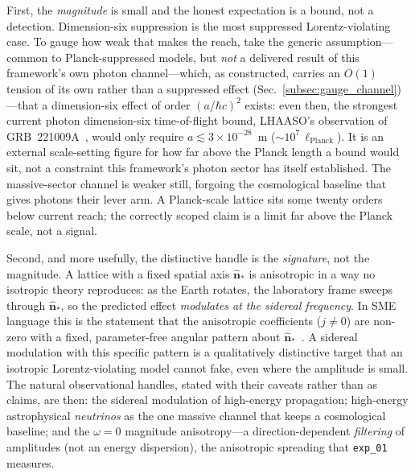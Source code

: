 First, the \emph{magnitude} is small and the honest expectation is a bound, not a
detection. Dimension-six suppression is the most suppressed Lorentz-violating case. To
gauge how weak that makes the reach, take the generic assumption---common to
Planck-suppressed models, but \emph{not} a delivered result of this framework's own
photon channel---which, as constructed, carries an $O(1)$ tension of its own rather than
a suppressed effect (Sec.~\ref{subsec:gauge_channel})---that a
dimension-six effect of order $(a/\hbar c)^2$ exists: even then, the strongest current
photon dimension-six time-of-flight bound, LHAASO's observation of
GRB~221009A~\cite{lhaaso2024grb}, would only require $a \lesssim 3\times10^{-28}$~m
($\sim\!10^{7}\,\ell_\text{Planck}$). It is an external scale-setting figure for how far
above the Planck length a bound would sit, not a constraint this framework's photon
sector has itself established. The massive-sector channel is weaker still, forgoing the
cosmological baseline that gives photons their lever arm. A Planck-scale lattice sits
some twenty orders below current reach; the correctly scoped claim is a limit far above
the Planck scale, not a signal.

Second, and more usefully, the distinctive handle is the \emph{signature}, not the
magnitude. A lattice with a fixed spatial axis $\hat{\mathbf{n}}_*$ is anisotropic in a
way no isotropic theory reproduces: as the Earth rotates, the laboratory frame sweeps
through $\hat{\mathbf{n}}_*$, so the predicted effect \emph{modulates at the sidereal
frequency}. In SME language this is the statement that the anisotropic coefficients
($j\neq0$) are non-zero with a fixed, parameter-free angular pattern about
$\hat{\mathbf{n}}_*$~\cite{kosteleckymewes2009}. A sidereal modulation with this
specific pattern is a qualitatively distinctive target that an isotropic
Lorentz-violating model cannot fake, even where the amplitude is small. The natural
observational handles, stated with their caveats rather than as claims, are then: the
sidereal modulation of high-energy propagation; high-energy astrophysical
\emph{neutrinos} as the one massive channel that keeps a cosmological baseline; and the
$\omega=0$ magnitude anisotropy---a direction-dependent \emph{filtering} of amplitudes
(not an energy dispersion), the anisotropic spreading that \texttt{exp\_01} measures.

